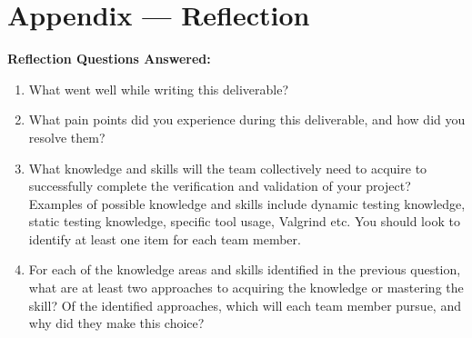 \documentclass[12pt, titlepage]{article}
\begin{document}
\newpage{}

\section{Appendix --- Reflection}

\textbf{Reflection Questions Answered:}
\begin{enumerate}
  \item What went well while writing this deliverable? 
  \item What pain points did you experience during this deliverable, and how
    did you resolve them?
  \item What knowledge and skills will the team collectively need to acquire to
  successfully complete the verification and validation of your project?
  Examples of possible knowledge and skills include dynamic testing knowledge,
  static testing knowledge, specific tool usage, Valgrind etc.  You should look to
  identify at least one item for each team member.
  \item For each of the knowledge areas and skills identified in the previous
  question, what are at least two approaches to acquiring the knowledge or
  mastering the skill?  Of the identified approaches, which will each team
  member pursue, and why did they make this choice?
\end{enumerate}
\end{document}

